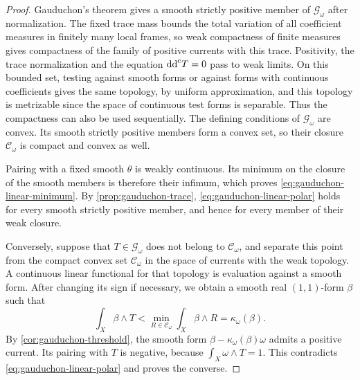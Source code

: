\begin{proof}
Gauduchon's theorem gives a smooth strictly positive member of $\mathscr G_\omega$ after normalization. The fixed trace mass bounds the total variation of all coefficient measures in finitely many local frames, so weak compactness of finite measures gives compactness of the family of positive currents with this trace. Positivity, the trace normalization and the equation $\mathrm{dd}^{\mathrm{c}} T=0$ pass to weak limits. On this bounded set, testing against smooth forms or against forms with continuous coefficients gives the same topology, by uniform approximation, and this topology is metrizable since the space of continuous test forms is separable. Thus the compactness can also be used sequentially. The defining conditions of $\mathscr G_\omega$ are convex. Its smooth strictly positive members form a convex set, so their closure $\mathscr C_\omega$ is compact and convex as well.

Pairing with a fixed smooth $\theta$ is weakly continuous. Its minimum on the closure of the smooth members is therefore their infimum, which proves \eqref{eq:gauduchon-linear-minimum}. By \cref{prop:gauduchon-trace}, \eqref{eq:gauduchon-linear-polar} holds for every smooth strictly positive member, and hence for every member of their weak closure.

Conversely, suppose that $T\in\mathscr G_\omega$ does not belong to $\mathscr C_\omega$, and separate this point from the compact convex set $\mathscr C_\omega$ in the space of currents with the weak topology. A continuous linear functional for that topology is evaluation against a smooth form. After changing its sign if necessary, we obtain a smooth real $(1,1)$-form $\beta$ such that
\[
 \int_X\beta\wedge T
 <\min_{R\in\mathscr C_\omega}\int_X\beta\wedge R
 =\kappa_\omega(\beta).
\]
By \cref{cor:gauduchon-threshold}, the smooth form $\beta-\kappa_\omega(\beta)\omega$ admits a positive current. Its pairing with $T$ is negative, because $\int_X\omega\wedge T=1$. This contradicts \eqref{eq:gauduchon-linear-polar} and proves the converse.
\end{proof}

